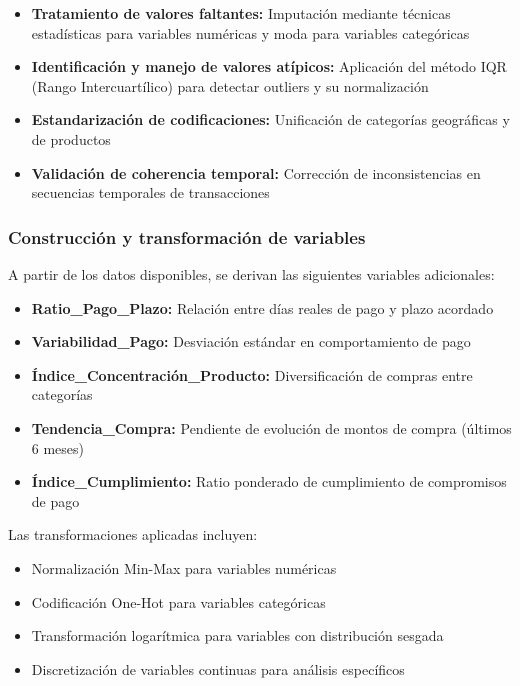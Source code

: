 \begin{itemize}
    \item \textbf{Tratamiento de valores faltantes:} Imputación mediante técnicas estadísticas para variables numéricas y moda para variables categóricas
    \item \textbf{Identificación y manejo de valores atípicos:} Aplicación del método IQR (Rango Intercuartílico) para detectar outliers y su normalización
    \item \textbf{Estandarización de codificaciones:} Unificación de categorías geográficas y de productos
    \item \textbf{Validación de coherencia temporal:} Corrección de inconsistencias en secuencias temporales de transacciones
\end{itemize}

\subsubsection{Construcción y transformación de variables}
A partir de los datos disponibles, se derivan las siguientes variables adicionales:

\begin{itemize}
    \item \textbf{Ratio\_Pago\_Plazo:} Relación entre días reales de pago y plazo acordado
    \item \textbf{Variabilidad\_Pago:} Desviación estándar en comportamiento de pago
    \item \textbf{Índice\_Concentración\_Producto:} Diversificación de compras entre categorías
    \item \textbf{Tendencia\_Compra:} Pendiente de evolución de montos de compra (últimos 6 meses)
    \item \textbf{Índice\_Cumplimiento:} Ratio ponderado de cumplimiento de compromisos de pago
\end{itemize}

Las transformaciones aplicadas incluyen:

\begin{itemize}
    \item Normalización Min-Max para variables numéricas
    \item Codificación One-Hot para variables categóricas
    \item Transformación logarítmica para variables con distribución sesgada
    \item Discretización de variables continuas para análisis específicos
\end{itemize}

